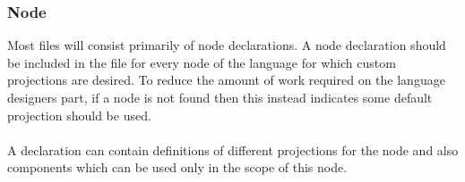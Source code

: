 \documentclass{article}
\begin{document}

\subsubsection{Node}

Most files will consist primarily of node declarations. A node declaration should be included in the file for every node of the language for which custom projections are desired. To reduce the amount of work required on the language designers part, if a node is not found then this instead indicates some default projection should be used.  
\\
\\
A declaration can contain definitions of different projections for the node and also components which can be used only in the scope of this node.
\end{document}
